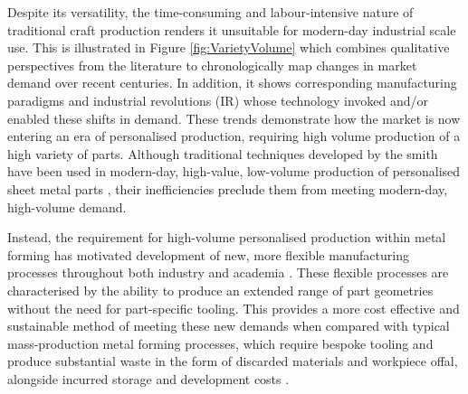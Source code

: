 Despite its versatility, the time-consuming and labour-intensive nature of traditional craft production renders it unsuitable for modern-day industrial scale use. This is illustrated in Figure \ref{fig:VarietyVolume} which combines qualitative perspectives from the literature \citep{Koren2010TheRevolution,Popkova2019FundamentalRevolutions,Mourtzis2012DecentralizedOutlook,Mourtzis2014TheCustomisation} to chronologically map changes in market demand over recent centuries. In addition, it shows corresponding manufacturing paradigms and industrial revolutions (IR) whose technology invoked  and/or enabled these shifts in demand. These trends demonstrate how the market is now entering an era of personalised production, requiring high volume production of a high variety of parts. Although traditional techniques developed by the smith have been used in modern-day, high-value, low-volume production of personalised sheet metal parts \citep{Amos2015Bloodhoundfeathers}, their inefficiencies preclude them from meeting modern-day, high-volume demand.

Instead, the requirement for high-volume personalised production within metal forming has motivated development of new, more flexible manufacturing processes throughout both industry and academia \citep{Allwood2006AJapan,Yang2018FlexibilityForming}. These flexible processes are characterised by the ability to produce an extended range of part geometries without the need for part-specific tooling. This provides a more cost effective and sustainable method of meeting these new demands when compared with typical mass-production metal forming processes, which require bespoke tooling and produce substantial waste in the form of discarded materials and workpiece offal, alongside incurred storage and development costs \citep{Cooper2017TheProcesses,Horton2019ImplementingComponents}. 


